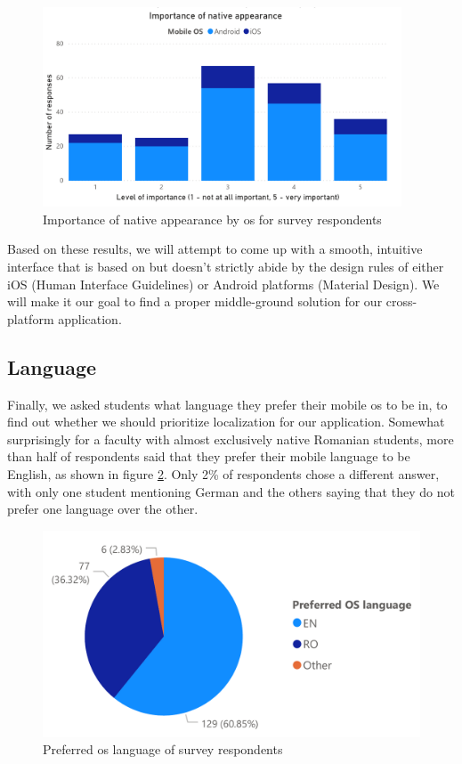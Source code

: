 \begin{figure}[ht]
    \centering
         \includegraphics[width=0.95\textwidth]{figures/charts/survey/native_appearance.pdf}
    \caption{Importance of native appearance by \acrshort{os} for survey respondents}
    \label{3:fig:native_appearance}
\end{figure}

Based on these results, we will attempt to come up with a smooth, intuitive interface that is based on but doesn't strictly abide by the design rules of either iOS (Human Interface Guidelines\cite{apple2020human}) or Android platforms (Material Design\cite{google2020material}). We will make it our goal to find a proper middle-ground solution for our cross-platform application.

\subsection{Language} \label{3:language}

Finally, we asked students what language they prefer their mobile \acrshort{os} to be in, to find out whether we should prioritize localization for our application. Somewhat surprisingly for a faculty with almost exclusively native Romanian students, more than half of respondents said that they prefer their mobile language to be English, as shown in figure \ref{3:fig:language}. Only 2\% of respondents chose a different answer, with only one student mentioning German and the others saying that they do not prefer one language over the other.

\begin{figure}[ht]
    \centering
         \includegraphics[height=0.2\textheight]{figures/charts/survey/language.pdf}
    \caption{Preferred \acrshort{os} language of survey respondents}
    \label{3:fig:language}
\end{figure}

